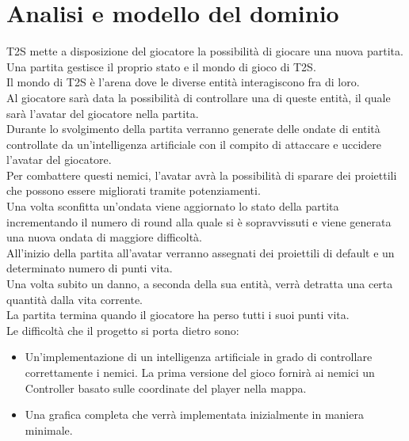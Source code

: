 \documentclass[a4paper,12pt]{report}
\begin{document}
\section{Analisi e modello del dominio}
T2S mette a disposizione del giocatore la possibilità di giocare una nuova partita.
\\
Una partita gestisce il proprio stato e il mondo di gioco di T2S.
\\
Il mondo di T2S è l’arena dove le diverse entità interagiscono fra di loro.
\\
Al giocatore sarà data la possibilità di controllare una di queste entità, il quale sarà l’avatar del giocatore nella partita.
\\
Durante lo svolgimento della partita verranno generate delle ondate di entità controllate da un’intelligenza artificiale con il compito di attaccare e uccidere l’avatar del giocatore.
\\
Per combattere questi nemici, l’avatar avrà la possibilità di sparare dei proiettili che possono essere migliorati tramite potenziamenti.
\\
Una volta sconfitta un’ondata viene aggiornato lo stato della partita incrementando il numero di round alla quale si è sopravvissuti e viene generata una nuova ondata di maggiore difficoltà.
\\
All’inizio della partita all’avatar verranno assegnati dei proiettili di default e un determinato numero di punti vita.
\\
Una volta subito un danno, a seconda della sua entità, verrà detratta una certa quantità dalla vita corrente.
\\
La partita termina quando il giocatore ha perso tutti i suoi punti vita.
\\
Le difficoltà che il progetto si porta dietro sono:
\begin{itemize}
	\item Un’implementazione di un intelligenza artificiale in grado di controllare correttamente i nemici. La prima versione del gioco fornirà ai nemici un Controller basato sulle coordinate del player nella mappa. 
	\item Una grafica completa che verrà implementata inizialmente in maniera minimale.

\end{itemize}
\end{document}
